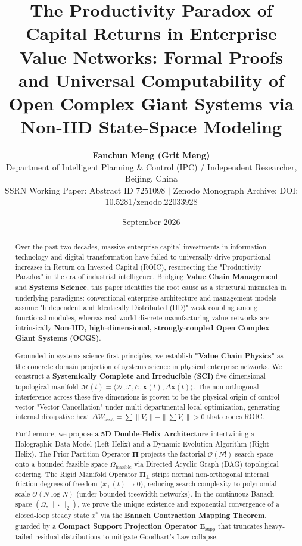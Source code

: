 \documentclass[11pt,a4paper]{article}
\title{\textbf{The Productivity Paradox of Capital Returns in Enterprise Value Networks: Formal Proofs and Universal Computability of Open Complex Giant Systems via Non-IID State-Space Modeling}}
\author{\textbf{Fanchun Meng (Grit Meng)}\\
\small Department of Intelligent Planning \& Control (IPC) / Independent Researcher, Beijing, China\\
\small SSRN Working Paper: Abstract ID 7251098 $|$ Zenodo Monograph Archive: DOI: 10.5281/zenodo.22033928}
\date{September 2026}
\begin{document}
\maketitle

\begin{abstract}
Over the past two decades, massive enterprise capital investments in information technology and digital transformation have failed to universally drive proportional increases in Return on Invested Capital (ROIC), resurrecting the "Productivity Paradox" in the era of industrial intelligence. Bridging \textbf{Value Chain Management} and \textbf{Systems Science}, this paper identifies the root cause as a structural mismatch in underlying paradigms: conventional enterprise architecture and management models assume "Independent and Identically Distributed (IID)" weak coupling among functional modules, whereas real-world discrete manufacturing value networks are intrinsically \textbf{Non-IID, high-dimensional, strongly-coupled Open Complex Giant Systems (OCGS)}.

Grounded in systems science first principles, we establish \textbf{"Value Chain Physics"} as the concrete domain projection of systems science in physical enterprise networks. We construct a \textbf{Systemically Complete and Irreducible (SCI)} five-dimensional topological manifold $\mathcal{M}(t) = \langle\mathcal{N},\mathcal{T},\mathcal{C},\mathbf{x}(t),\Delta\mathbf{x}(t)\rangle$. The non-orthogonal interference across these five dimensions is proven to be the physical origin of control vector "Vector Cancellation" under multi-departmental local optimization, generating internal dissipative heat $\Delta W_{\text{heat}} = \sum \|V_i\| - \|\sum V_i\| > 0$ that erodes ROIC.

Furthermore, we propose a \textbf{5D Double-Helix Architecture} intertwining a Holographic Data Model (Left Helix) and a Dynamic Evolution Algorithm (Right Helix). The Prior Partition Operator $\mathbf{\Pi}$ projects the factorial $\mathcal{O}(N!)$ search space onto a bounded feasible space $\Omega_{\mathrm{feasible}}$ via Directed Acyclic Graph (DAG) topological ordering. The Rigid Manifold Operator $\mathbf{\Pi}_\bot$ strips normal non-orthogonal internal friction degrees of freedom ($x_\bot(t) \to 0$), reducing search complexity to polynomial scale $\mathcal{O}(N \log N)$ (under bounded treewidth networks). In the continuous Banach space $(\Omega, \|\cdot\|_2)$, we prove the unique existence and exponential convergence of a closed-loop steady state $x^*$ via the \textbf{Banach Contraction Mapping Theorem}, guarded by a \textbf{Compact Support Projection Operator $\mathbf{E}_{\mathrm{supp}}$} that truncates heavy-tailed residual distributions to mitigate Goodhart's Law collapse.


\end{abstract}
\end{document}
